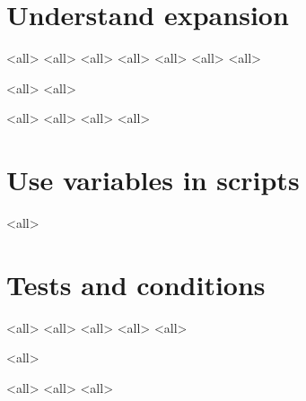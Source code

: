 \section{Understand expansion}
\mode<all>{}
\mode<all>{}
\mode<all>{}
\mode<all>{}
\mode<all>{}
\mode<all>{}
\mode<all>{}

\mode<all>{}
\mode<all>{}

\mode<all>{}
\mode<all>{}
\mode<all>{}
\mode<all>{}


\section{Use variables in scripts}

\mode<all>{}

\section{Tests and conditions}
\mode<all>{}
\mode<all>{}
\mode<all>{}
\mode<all>{}
\mode<all>{}

\mode<all>{}


\mode<all>{}
\mode<all>{}
\mode<all>{}

